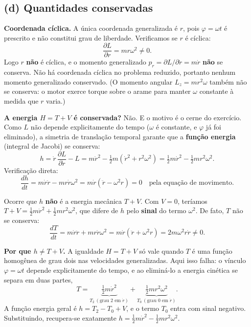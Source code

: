 \documentclass{article}
\begin{document}
\subsection*{(d) Quantidades conservadas}

\textbf{Coordenada cíclica.} A única coordenada generalizada é $r$, pois $\varphi = \omega t$
é prescrito e não constitui grau de liberdade. Verificamos se $r$ é cíclica:
\[
\frac{\partial L}{\partial r} = m r\omega^2 \neq 0.
\]
Logo $r$ \textbf{não} é cíclica, e o momento generalizado $p_r = \partial L/\partial\dot r = m\dot r$
\textbf{não} se conserva. Não há coordenada cíclica no problema reduzido, portanto
nenhum momento generalizado conservado. (O momento angular $L_z = m r^2\omega$ também
não se conserva: o motor exerce torque sobre o arame para manter $\omega$ constante à
medida que $r$ varia.)

\textbf{A energia $H = T + V$ é conservada?} Não. E o motivo é o cerne do exercício.
Como $L$ não depende explicitamente do tempo ($\omega$ é constante, e $\varphi$ já foi
eliminado), a simetria de translação temporal garante que a \textbf{função energia}
(integral de Jacobi) se conserva:
\[
h = \dot r\,\frac{\partial L}{\partial \dot r} - L
= m\dot r^2 - \tfrac{1}{2}m\left(\dot r^2 + r^2\omega^2\right)
= \tfrac{1}{2}m\dot r^2 - \tfrac{1}{2}m r^2\omega^2.
\]
Verificação direta:
\[
\frac{dh}{dt} = m\dot r\ddot r - m r\dot r\omega^2 = m\dot r\left(\ddot r - \omega^2 r\right) = 0
\quad\text{pela equação de movimento.}
\]

Ocorre que $h$ \textbf{não} é a energia mecânica $T + V$. Com $V = 0$, teríamos
$T + V = \tfrac{1}{2}m\dot r^2 + \tfrac{1}{2}m r^2\omega^2$, que difere de $h$ pelo
\textbf{sinal} do termo $\omega^2$. De fato, $T$ não se conserva:
\[
\frac{dT}{dt} = m\dot r\ddot r + m r\dot r\omega^2 = m\dot r\left(\ddot r + \omega^2 r\right)
= 2m\omega^2 r\dot r \neq 0.
\]

\textbf{Por que $h \neq T + V$.} A igualdade $H = T + V$ só vale quando $T$ é uma
função homogênea de grau dois nas velocidades generalizadas. Aqui isso falha: o
vínculo $\varphi = \omega t$ depende explicitamente do tempo, e ao eliminá-lo a energia
cinética se separa em duas partes,
\[
T = \underbrace{\tfrac{1}{2}m\dot r^2}_{T_2\ (\text{grau 2 em }\dot r)}
+ \underbrace{\tfrac{1}{2}m r^2\omega^2}_{T_0\ (\text{grau 0 em }\dot r)}.
\]
A função energia geral é $h = T_2 - T_0 + V$, e o termo $T_0$ entra com sinal
negativo. Substituindo, recupera-se exatamente $h = \tfrac{1}{2}m\dot r^2 - \tfrac{1}{2}m r^2\omega^2$.
\end{document}
